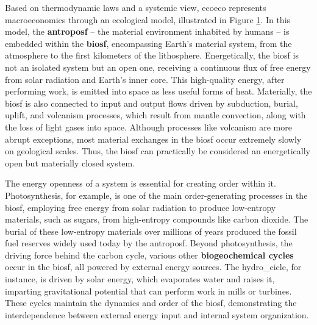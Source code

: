 \documentclass[./main_en.tex]{subfiles}
\begin{document}
\begin{figure}[t!]
{}
\label{fig:eco:ecomodel} 		
\end{figure}

\par Based on thermodynamic laws and a systemic view, \gls{ecoeco} represents macroeconomics through an ecological \gls{model}, illustrated in Figure \ref{fig:eco:ecomodel}. In this \gls{model}, the \textbf{\gls{antroposf}} – the material environment inhabited by humans – is embedded within the \textbf{\gls{biosf}}, encompassing Earth’s material \gls{system}, from the atmosphere to the first kilometers of the lithosphere. Energetically, the \gls{biosf} is not an isolated \gls{system} but an open one, receiving a continuous flux of free energy from solar radiation and Earth’s inner core. This high-quality energy, after performing work, is emitted into space as less useful forms of heat. Materially, the \gls{biosf} is also connected to input and output flows driven by subduction, burial, uplift, and volcanism processes, which result from mantle convection, along with the loss of light gases into space. Although processes like volcanism are more abrupt exceptions, most material exchanges in the \gls{biosf} occur extremely slowly on geological scales. Thus, the \gls{biosf} can practically be considered an energetically open but materially closed \gls{system}.

\par The energy openness of a \gls{system} is essential for creating order within it. Photosynthesis, for example, is one of the main order-generating processes in the \gls{biosf}, employing free energy from solar radiation to produce low-entropy materials, such as sugars, from high-entropy compounds like carbon dioxide. The burial of these low-entropy materials over millions of years produced the fossil fuel reserves widely used today by the \gls{antroposf}. Beyond photosynthesis, the driving force behind the carbon cycle, various other \textbf{biogeochemical cycles} occur in the \gls{biosf}, all powered by external energy sources. The \gls{hydro_cicle}, for instance, is driven by solar energy, which evaporates water and raises it, imparting gravitational potential that can perform work in mills or turbines. These cycles maintain the dynamics and order of the \gls{biosf}, demonstrating the interdependence between external energy input and internal system organization.
\end{document}
